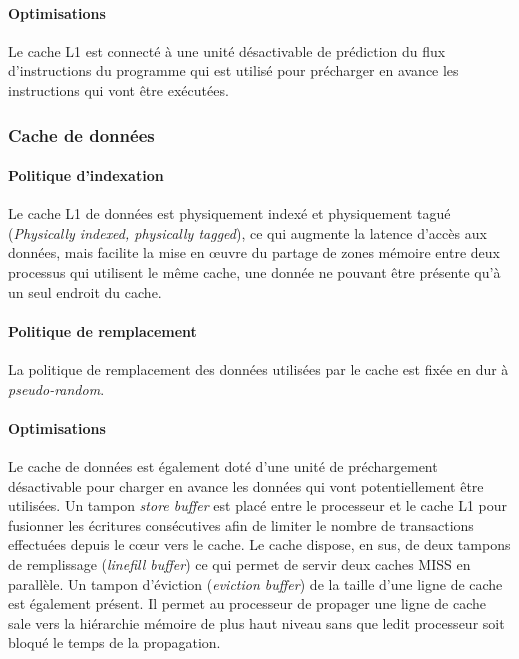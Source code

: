         \paragraph{Optimisations} Le cache L1 est connecté à une unité désactivable de prédiction du flux d'instructions du programme qui est utilisé pour précharger en avance les instructions qui vont être exécutées.


        \subsubsection{Cache de données}

            \paragraph{Politique d'indexation}
            Le cache L1 de données est physiquement indexé et physiquement tagué (\emph{Physically indexed, physically tagged}), ce qui augmente la latence d'accès aux données, mais facilite la mise en œuvre du partage de zones mémoire entre deux processus qui utilisent le même cache, une donnée ne pouvant être présente qu'à un seul endroit du cache.
            
            \paragraph{Politique de remplacement}
            La politique de remplacement des données utilisées par le cache est fixée en dur à \emph{pseudo-random}.
            
            \paragraph{Optimisations}
            Le cache de données est également doté d'une unité de préchargement désactivable pour charger en avance les données qui vont potentiellement être utilisées.
            Un tampon \emph{store buffer} est placé entre le processeur et le cache L1 pour fusionner les écritures consécutives afin de limiter le nombre de transactions effectuées depuis le cœur vers le cache. Le cache dispose, en sus, de deux tampons de remplissage (\emph{linefill buffer}) ce qui permet de servir deux caches MISS en parallèle. Un tampon d'éviction (\emph{eviction buffer}) de la taille d'une ligne de cache est également présent. Il permet au processeur de propager une ligne de cache sale vers la hiérarchie mémoire de plus haut niveau sans que ledit processeur soit bloqué le temps de la propagation.

